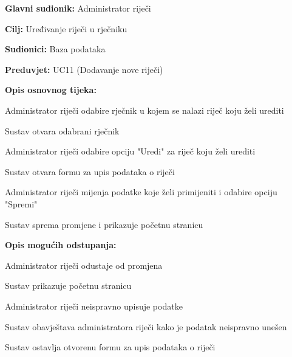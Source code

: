 					\noindent {}
				\begin{packed_item}
					
					\item \textbf{Glavni sudionik: }Administrator riječi
					\item  \textbf{Cilj:} Uređivanje riječi u rječniku
					\item  \textbf{Sudionici:} Baza podataka
					\item  \textbf{Preduvjet:} UC11 (Dodavanje nove riječi)
					\item  \textbf{Opis osnovnog tijeka:}
					
					\item[] \begin{packed_enum}
						
						\item Administrator riječi odabire rječnik u kojem se nalazi riječ koju želi urediti
						\item Sustav otvara odabrani rječnik
						\item Administrator riječi odabire opciju "Uredi" za riječ koju želi urediti
						\item Sustav otvara formu za upis podataka o riječi
						\item Administrator riječi mijenja podatke koje želi primijeniti i odabire opciju "Spremi"
						\item Sustav sprema promjene i prikazuje početnu stranicu
					\end{packed_enum}
					
					\item  \textbf{Opis mogućih odstupanja:}
					
					\item[] \begin{packed_item}
						
						\item[5.a] Administrator riječi odustaje od promjena
						\item[] \begin{packed_enum}
							
							\item Sustav prikazuje početnu stranicu
							
						\end{packed_enum}
						
						\item[5.b] Administrator riječi neispravno upisuje podatke
						\item[] \begin{packed_enum}
							
							\item Sustav obavještava administratora riječi kako je podatak neispravno unešen
							\item Sustav ostavlja otvorenu formu za upis podataka o riječi
							
						\end{packed_enum}
						
					\end{packed_item}
				\end{packed_item}
				
